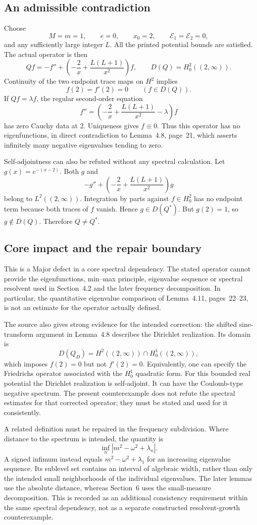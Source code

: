 \documentclass[10pt]{article}
\begin{document}
\subsection*{An admissible contradiction}
Choose \[M=m=1,\qquad e=0,\qquad x_0=2,\qquad
 \mathcal E_1=\mathcal E_2=0,\] and any sufficiently large integer \(L\). All the printed potential bounds are satisfied. The actual operator is then \[Qf=-f''+\left(-\frac2x+\frac{L(L+1)}{x^2}\right)f,\qquad
 D(Q)=H^2_0((2,\infty)).\] Continuity of the two endpoint trace maps on \(H^2\) implies \[f(2)=f'(2)=0\qquad(f\in D(Q)).\] If \(Qf=\lambda f\), the regular second-order equation \[f''=\left(-\frac2x+\frac{L(L+1)}{x^2}-\lambda\right)f\] has zero Cauchy data at \(2\). Uniqueness gives \(f\equiv0\). Thus this operator has no eigenfunctions, in direct contradiction to Lemma 4.8, page 21, which asserts infinitely many negative eigenvalues tending to zero.\par
Self-adjointness can also be refuted without any spectral calculation. Let \(g(x)=e^{-(x-2)}\). Both \(g\) and \[-g''+\left(-\frac2x+\frac{L(L+1)}{x^2}\right)g\] belong to \(L^2((2,\infty))\). Integration by parts against \(f\in H^2_0\) has no endpoint term because both traces of \(f\) vanish. Hence \(g\in D(Q^*)\). But \(g(2)=1\), so \(g\notin D(Q)\). Therefore \(Q\ne Q^*\).\par
\subsection*{Core impact and the repair boundary}
This is a Major defect in a core spectral dependency. The stated operator cannot provide the eigenfunctions, min–max principle, eigenvalue sequence or spectral resolvent used in Section 4.2 and the later frequency decomposition. In particular, the quantitative eigenvalue comparison of Lemma 4.11, pages 22–23, is not an estimate for the operator actually defined.\par
The source also gives strong evidence for the intended correction: the shifted sine-transform argument in Lemma 4.8 describes the Dirichlet realization. Its domain is \[D(Q_D)=H^2((2,\infty))\cap H^1_0((2,\infty)),\] which imposes \(f(2)=0\) but not \(f'(2)=0\). Equivalently, one can specify the Friedrichs operator associated with the \(H^1_0\) quadratic form. For this bounded real potential the Dirichlet realization is self-adjoint. It can have the Coulomb-type negative spectrum. The present counterexample does not refute the spectral estimates for that corrected operator; they must be stated and used for it consistently.\par
A related definition must be repaired in the frequency subdivision. Where distance to the spectrum is intended, the quantity is \[\inf_n|m^2-\omega^2+\lambda_n|.\] A signed infimum instead equals \(m^2-\omega^2+\lambda_1\) for an increasing eigenvalue sequence. Its sublevel set contains an interval of algebraic width, rather than only the intended small neighborhoods of the individual eigenvalues. The later lemmas use the absolute distance, whereas Section 6 uses the small-measure decomposition. This is recorded as an additional consistency requirement within the same spectral dependency, not as a separate constructed resolvent-growth counterexample.\par
\end{document}
